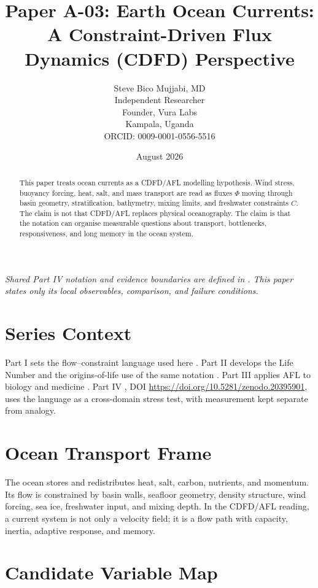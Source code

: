\documentclass[12pt,a4paper]{article}
\title{\textbf{Paper A-03: Earth Ocean Currents:\\ A Constraint-Driven Flux Dynamics (CDFD) Perspective}}
\author{Steve Bico Mujjabi, MD\\
\small Independent Researcher\\
\small Founder, Vura Labs\\
\small Kampala, Uganda\\
\small ORCID: 0009-0001-0556-5516}
\date{August 2026}
\begin{document}
\maketitle

\noindent\textit{Shared Part IV notation and evidence boundaries are defined in . This paper states only its local observables, comparison, and failure conditions.}

\begin{abstract}
This paper treats ocean currents as a CDFD/AFL modelling hypothesis. Wind
stress, buoyancy forcing, heat, salt, and mass transport are read as fluxes
$\Phi$ moving through basin geometry, stratification, bathymetry, mixing limits,
and freshwater constraints $C$. The claim is not that CDFD/AFL replaces
physical oceanography. The claim is that the notation can organise measurable
questions about transport, bottlenecks, responsiveness, and long memory in the
ocean system.
\end{abstract}

\section{Series Context}

Part I sets the flow--constraint language used here \cite{MujjabiPartI2026}.
Part II develops the Life Number and the origins-of-life use of the same notation
\cite{MujjabiPartII2026}. Part III applies AFL to biology and medicine
\cite{MujjabiPartIII2026}. Part IV \cite{MujjabiPartIV2026}, DOI \url{https://doi.org/10.5281/zenodo.20395901}, uses the language as a cross-domain stress
test, with measurement kept separate from analogy.

\section{Ocean Transport Frame}

The ocean stores and redistributes heat, salt, carbon, nutrients, and momentum.
Its flow is constrained by basin walls, seafloor geometry, density structure,
wind forcing, sea ice, freshwater input, and mixing depth. In the CDFD/AFL
reading, a current system is not only a velocity field; it is a flow path with
capacity, inertia, adaptive response, and memory.

\section{Candidate Variable Map}
\end{document}
